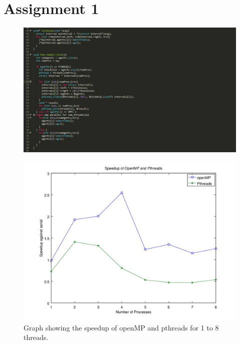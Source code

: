 \documentclass{beamer}
\title[Crisis] %
{}
\author[]{\small Markus Palacios \\ \emph{markus.palacios.5733@student.uu.se} \\ \and Jonathan Sharyari \\ \emph{jonathan.sharyari.0152@student.uu.se} \\  Peng Sun\\\emph{peng.sun.8197@student.uu.se}}
\subtitle{Project Presentation}
\date[2015-03-13] %
{March $13^{th}$, 2015}
\institute[Dept. of Information Technology] %
{
	Department of Information Technology\\
		Uppsala University
}
\begin{document}
\begin{frame}[plain]
\titlepage
\end{frame}

\section{Assignment 1}
\begin{frame}
	\begin{figure}[h!]
	\includegraphics[width=\textwidth]{code.jpg}
	\end{figure}
\end{frame}

\begin{frame}
	\begin{figure}[h!]
	\includegraphics[width=\textwidth]{lab1graph.jpg}
	\caption{Graph showing the speedup of openMP and pthreads for 1 to 8 threads.}
	\end{figure}
\end{frame}
\end{document}

